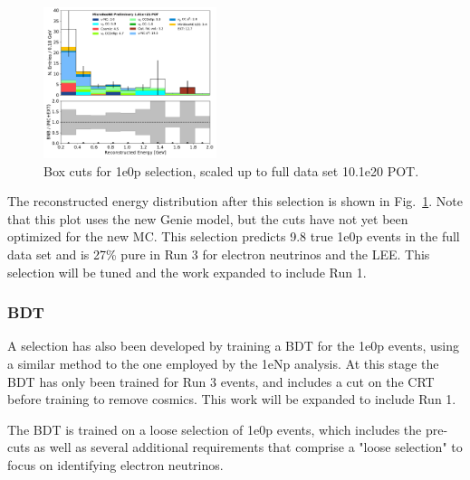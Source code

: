 \documentclass[a4paper]{article}
\begin{document}
\begin{figure}[H]
\begin{center}
\includegraphics[width=0.45\textwidth]{1e0p/reco_e_01162020_RUN3.pdf}
\caption{\label{fig:1e0p:cutbased:RUN3} Box cuts for 1e0p selection, scaled up to full data set 10.1e20 POT.}
\end{center}
\end{figure}

The reconstructed energy distribution after this selection is shown in Fig.~\ref{fig:1e0p:cutbased:RUN3}.  Note that this plot uses the new Genie model, but the cuts have not yet been optimized for the new MC.  This selection predicts 9.8 true 1e0p events in the full data set and is 27\% pure in Run 3 for electron neutrinos and the LEE.  This selection will be tuned and the work expanded to include Run 1.

\subsubsection{BDT}

A selection has also been developed by training a BDT for the 1e0p events, using a similar method to the one employed by the 1eNp analysis.  At this stage the BDT has only been trained for Run 3 events, and includes a cut on the CRT before training to remove cosmics.  This work will be expanded to include Run 1.

The BDT is trained on a loose selection of 1e0p events, which includes the pre-cuts as well as several additional requirements that comprise a "loose selection" to focus on identifying electron neutrinos.
\end{document}
